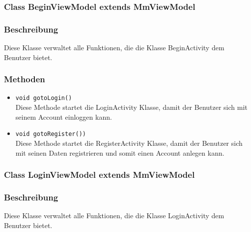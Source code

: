 \documentclass[a4paper]{scrreprt}
\begin{document}

\subsubsection{Class BeginViewModel extends MmViewModel}
\subsubsection*{Beschreibung}
Diese Klasse verwaltet alle Funktionen, die die Klasse BeginActivity dem Benutzer bietet.

\subsubsection*{Methoden}
\begin{addmargin}[25pt]{0pt}
\begin{itemize}

\item \texttt{void gotoLogin()}\\
	Diese Methode startet die LoginActivity Klasse, damit der Benutzer sich mit seinem Account einloggen kann.

\item \texttt{void gotoRegister())}\\
	Diese Methode startet die RegisterActivity Klasse, damit der Benutzer sich mit seinen Daten registrieren und somit einen Account anlegen kann.

\end{itemize}
\end{addmargin}


\subsubsection{Class LoginViewModel extends MmViewModel}
\subsubsection*{Beschreibung}
Diese Klasse verwaltet alle Funktionen, die die Klasse LoginActivity dem Benutzer bietet.
\end{document}
